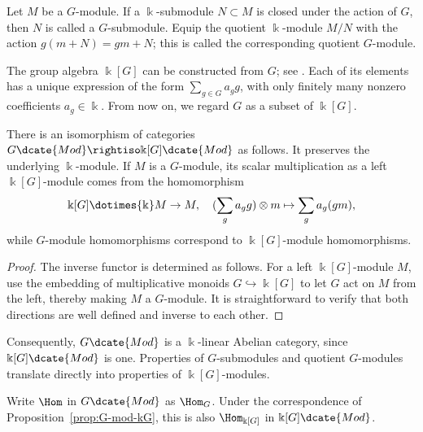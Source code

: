 \begin{definition}
	Let $M$ be a $G$-module. If a $\Bbbk$-submodule $N\subset M$ is closed
	under the action of $G$, then $N$ is called a $G$-submodule. Equip the
	quotient $\Bbbk$-module $M/N$ with the action $g(m+N)=gm+N$; this is called
	the corresponding quotient $G$-module.
\end{definition}

The group algebra $\Bbbk[G]$ can be constructed from $G$; see
\cite[Definition 5.6.3]{Li1}. Each of its elements has a unique expression of
the form $\sum_{g\in G}a_gg$, with only finitely many nonzero coefficients
$a_g\in\Bbbk$. From now on, we regard $G$ as a subset of $\Bbbk[G]$.

\begin{proposition}\label{prop:G-mod-kG}
	There is an isomorphism of categories
	$G\dcate{Mod}\rightiso\Bbbk[G]\dcate{Mod}$ as follows. It preserves the
	underlying $\Bbbk$-module. If $M$ is a $G$-module, its scalar
	multiplication as a left $\Bbbk[G]$-module comes from the homomorphism
	\[ \Bbbk[G] \dotimes{\Bbbk} M \to M, \quad (\sum_g a_g g) \otimes m \mapsto \sum_g a_g (gm), \]
	while $G$-module homomorphisms correspond to $\Bbbk[G]$-module
	homomorphisms.
\end{proposition}

\begin{proof}
	The inverse functor is determined as follows. For a left $\Bbbk[G]$-module
	$M$, use the embedding of multiplicative monoids
	$G\hookrightarrow\Bbbk[G]$ to let $G$ act on $M$ from the left, thereby
	making $M$ a $G$-module. It is straightforward to verify that both
	directions are well defined and inverse to each other.
\end{proof}

Consequently, $G\dcate{Mod}$ is a $\Bbbk$-linear Abelian category, since
$\Bbbk[G]\dcate{Mod}$ is one. Properties of $G$-submodules and quotient
$G$-modules translate directly into properties of $\Bbbk[G]$-modules.

\begin{definition}\label{def:HomG}
	Write $\Hom$ in $G\dcate{Mod}$ as $\Hom_G$. Under the correspondence of
	Proposition~\ref{prop:G-mod-kG}, this is also $\Hom_{\Bbbk[G]}$ in
	$\Bbbk[G]\dcate{Mod}$.
\end{definition}

